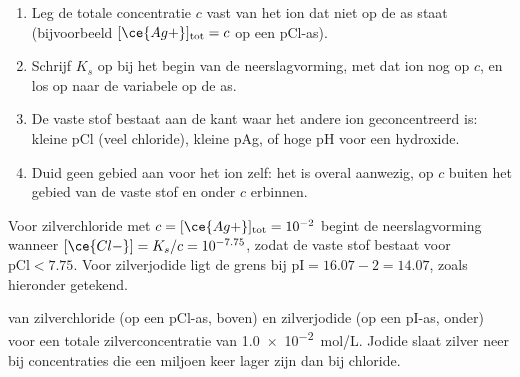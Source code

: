 \begin{method}\label{met:b1:precipitation:existence-domain}
\begin{enumerate}
  \item Leg de totale concentratie $c$ vast van het ion dat niet op de as
        staat (bijvoorbeeld $[\ce{Ag+}]_{\mathrm{tot}} = c$ op een
        pCl-as).
  \item Schrijf $K_s$ op bij het begin van de neerslagvorming, met dat ion
        nog op $c$, en los op naar de variabele op de as.
  \item De vaste stof bestaat aan de kant waar het andere ion
        geconcentreerd is: kleine pCl (veel chloride), kleine pAg, of
        hoge pH voor een hydroxide.
  \item Duid geen gebied aan voor het ion zelf: het is overal aanwezig,
        op $c$ buiten het gebied van de vaste stof en onder $c$ erbinnen.
\end{enumerate}
\end{method}

Voor zilverchloride met $c = [\ce{Ag+}]_{\mathrm{tot}} = 10^{-2}$ begint
de neerslagvorming wanneer $[\ce{Cl-}] = K_s/c = 10^{-7.75}$, zodat de
vaste stof bestaat voor $\mathrm{pCl} < 7.75$. Voor zilverjodide ligt de
grens bij $\mathrm{pI} = 16.07 - 2 = 14.07$, zoals hieronder getekend.

\begin{omfigure}

{\small {} van zilverchloride (op een pCl-as, boven) en
zilverjodide (op een pI-as, onder) voor een totale zilverconcentratie
van \qty{1.0e-2}{mol/L}. Jodide slaat zilver neer bij concentraties die
een miljoen keer lager zijn dan bij chloride.}
\end{omfigure}

